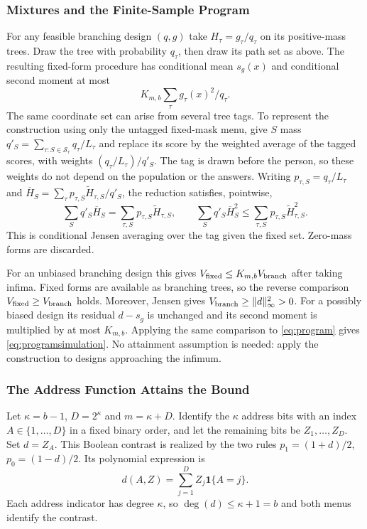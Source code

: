 \subsubsection{Mixtures and the Finite-Sample Program}
For any feasible branching design $(q,g)$ take $H_\tau=g_\tau/q_\tau$ on its positive-mass trees. Draw the tree with probability $q_\tau$, then draw its path set as above. The resulting fixed-form procedure has conditional mean $s_g(x)$ and conditional second moment at most
\[
 K_{m,b}\sum_\tau g_\tau(x)^2/q_\tau.
\]
The same coordinate set can arise from several tree tags. To represent the construction using only the untagged fixed-mask menu, give $S$ mass $q'_S=\sum_{\tau:S\in\mathcal S_\tau}q_\tau/L_\tau$ and replace its score by the weighted average of the tagged scores, with weights $(q_\tau/L_\tau)/q'_S$. The tag is drawn before the person, so these weights do not depend on the population or the answers. Writing $p_{\tau,S}=q_\tau/L_\tau$ and $\overline H_S=\sum_\tau p_{\tau,S}\widetilde H_{\tau,S}/q'_S$, the reduction satisfies, pointwise,
\[
 \sum_Sq'_S\overline H_S=\sum_{\tau,S}p_{\tau,S}\widetilde H_{\tau,S},
 \qquad
 \sum_Sq'_S\overline H_S^2\le\sum_{\tau,S}p_{\tau,S}\widetilde H_{\tau,S}^2.
\]
This is conditional Jensen averaging over the tag given the fixed set. Zero-mass forms are discarded.

For an unbiased branching design this gives $V_{\rm fixed}\le K_{m,b}V_{\rm branch}$ after taking infima. Fixed forms are available as branching trees, so the reverse comparison $V_{\rm fixed}\ge V_{\rm branch}$ holds. Moreover, Jensen gives $V_{\rm branch}\ge\|d\|_\infty^2>0$. For a possibly biased design its residual $d-s_g$ is unchanged and its second moment is multiplied by at most $K_{m,b}$. Applying the same comparison to \eqref{eq:program} gives \eqref{eq:programsimulation}. No attainment assumption is needed: apply the construction to designs approaching the infimum.

\subsubsection{The Address Function Attains the Bound}
Let $\kappa=b-1$, $D=2^\kappa$ and $m=\kappa+D$. Identify the $\kappa$ address bits with an index $A\in\{1,\ldots,D\}$ in a fixed binary order, and let the remaining bits be $Z_1,\ldots,Z_D$. Set $d=Z_A$. This Boolean contrast is realized by the two rules $p_1=(1+d)/2$, $p_0=(1-d)/2$. Its polynomial expression is
\[
 d(A,Z)=\sum_{j=1}^D Z_j\mathbf1\{A=j\}.
\]
Each address indicator has degree $\kappa$, so $\deg(d)\le \kappa+1=b$ and both menus identify the contrast.

